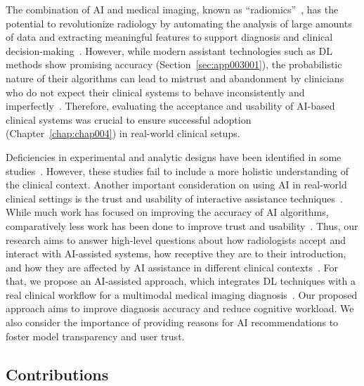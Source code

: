 The combination of \ac{AI} and medical imaging, known as ``radiomics''~\cite{Lambin2017}, has the potential to revolutionize radiology by automating the analysis of large amounts of data and extracting meaningful features to support diagnosis and clinical decision-making~\cite{Ruddle:2016:DEI:2872314.2834117}.
However, while modern assistant technologies such as \ac{DL} methods show promising accuracy (Section~\ref{sec:app003001}), the probabilistic nature of their algorithms can lead to mistrust and abandonment by clinicians who do not expect their clinical systems to behave inconsistently and imperfectly~\cite{Kocielnik:2019:YAI:3290605.3300641}.
Therefore, evaluating the acceptance and usability of \ac{AI}-based clinical systems was crucial to ensure successful adoption (Chapter~\ref{chap:chap004}) in real-world clinical setups.

Deficiencies in experimental and analytic designs have been identified in some studies~\cite{Sultanum:2018:MTP:3173574.3173996}.
However, these studies fail to include a more holistic understanding of the clinical context.
Another important consideration on using \ac{AI} in real-world clinical settings is the trust and usability of interactive assistance techniques~\cite{Cadario2021}.
While much work has focused on improving the accuracy of \ac{AI} algorithms, comparatively less work has been done to improve trust and usability~\cite{CALISTO2021102607}.
Thus, our research aims to answer high-level questions about how radiologists accept and interact with AI-assisted systems, how receptive they are to their introduction, and how they are affected by \ac{AI} assistance in different clinical contexts~\cite{CALISTO2022102285, CALISTO2021102607}.
For that, we propose an \ac{AI}-assisted approach, which integrates \ac{DL} techniques with a real clinical workflow for a multimodal medical imaging diagnosis~\cite{10.1145/3399715.3399744}.
Our proposed approach aims to improve diagnosis accuracy and reduce cognitive workload.
We also consider the importance of providing reasons for \ac{AI} recommendations to foster model transparency and user trust.

\subsection{Contributions}
\label{sec:chap005001001}

